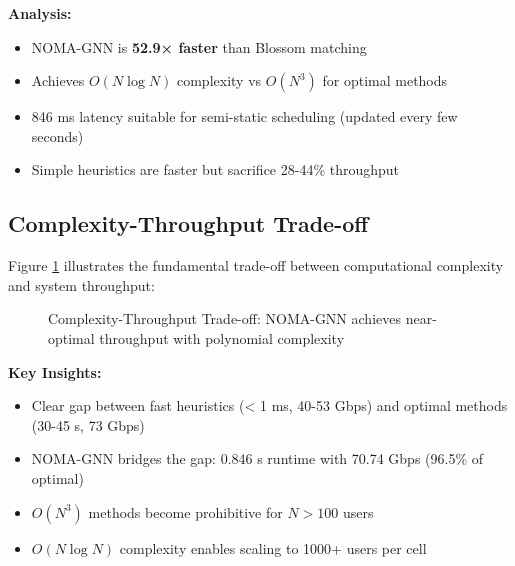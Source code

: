 \textbf{Analysis:}
\begin{itemize}
    \item NOMA-GNN is \textbf{52.9× faster} than Blossom matching
    \item Achieves $O(N \log N)$ complexity vs $O(N^3)$ for optimal methods
    \item 846 ms latency suitable for semi-static scheduling (updated every few seconds)
    \item Simple heuristics are faster but sacrifice 28-44\% throughput
\end{itemize}

\subsection{Complexity-Throughput Trade-off}

Figure \ref{fig:tradeoff} illustrates the fundamental trade-off between computational complexity and system throughput:

\begin{figure}[H]
\centering
{}
\caption{Complexity-Throughput Trade-off: NOMA-GNN achieves near-optimal throughput with polynomial complexity}
\label{fig:tradeoff}
\end{figure}

\textbf{Key Insights:}
\begin{itemize}
    \item Clear gap between fast heuristics (< 1 ms, 40-53 Gbps) and optimal methods (30-45 s, 73 Gbps)
    \item NOMA-GNN bridges the gap: 0.846 s runtime with 70.74 Gbps (96.5\% of optimal)
    \item $O(N^3)$ methods become prohibitive for $N > 100$ users
    \item $O(N \log N)$ complexity enables scaling to 1000+ users per cell
\end{itemize}

